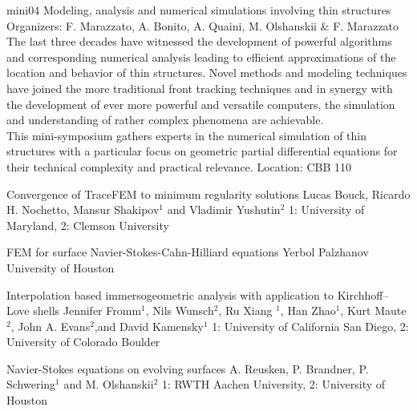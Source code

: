\mini
{mini04}
{Modeling, analysis and numerical simulations involving thin structures}
{Organizers: F. Marazzato, A. Bonito, A. Quaini, M. Olshanskii \& F. Marazzato}
{The last three decades have witnessed the development of powerful algorithms and corresponding numerical analysis leading to efficient approximations of the location and behavior of thin structures. Novel methods and modeling techniques have joined the more traditional front tracking techniques and in synergy with the development of ever more powerful and versatile computers, the simulation and understanding of rather complex phenomena are achievable.\\
This mini-symposium gathers experts in the numerical simulation of thin structures with a particular focus on geometric partial differential equations for their technical complexity and practical relevance.}
{Location: CBB 110}

\begin{talks}
\item\talk
{Convergence of TraceFEM to minimum regularity solutions}
{Lucas Bouck, Ricardo H. Nochetto, Mansur Shakipov$^{1}$ and Vladimir Yushutin$^{2}$}
{1: University of Maryland, 2: Clemson University}
\item\talk
{FEM for surface Navier-Stokes-Cahn-Hilliard equations}
{Yerbol Palzhanov}
{University of Houston}
\item\talk
{Interpolation based immersogeometric analysis with application to Kirchhoff--Love shells}
{Jennifer Fromm$^{1}$, Nils Wunsch$^{2}$,  Ru Xiang $^{1}$, Han Zhao$^{1}$, Kurt Maute$^{2}$, John A. Evans$^{2}$,and David Kamensky$^{1}$}
{1: University of California San Diego, 2: University of Colorado Boulder}
\item\talk
{Navier-Stokes equations on evolving surfaces}
{A. Reusken, P. Brandner, P. Schwering$^{1}$ and M. Olshanskii$^{2}$}
{1: RWTH Aachen University, 2: University of Houston}
\end{talks}
\room
